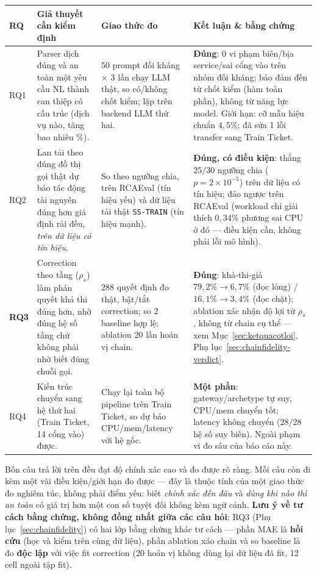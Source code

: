 \documentclass[11pt,a4paper]{article}
\begin{document}
\begin{center}\footnotesize
\begin{tabular}{p{0.9cm}p{3.5cm}p{3.6cm}p{5.4cm}}
\toprule \textbf{RQ} & \textbf{Giả thuyết cần kiểm định} & \textbf{Giao thức đo} & \textbf{Kết luận \& bằng chứng} \\ \midrule
RQ1 & Parser dịch đúng và an toàn một yêu cầu NL thành can thiệp có cấu trúc
  (dịch vụ nào, tăng bao nhiêu \%). &
  50 prompt đối kháng $\times$ 3 lần chạy LLM thật, so có/không chốt kiểm; lặp
  trên backend LLM thứ hai. &
  \textbf{Đúng}: $0$ vi phạm biên/bịa service/sai cổng vào trên nhóm đối kháng;
  bảo đảm đến từ chốt kiểm (hàm toàn phần), không từ năng lực model. Giới hạn:
  cỡ mẫu hiệu chuẩn $4{,}5\%$; đã sửa 1 lỗi transfer sang Train Ticket. \\
RQ2 & Lan tải theo đúng đồ thị gọi thật dự báo tác động tài nguyên đúng hơn giả
  định rải đều, \emph{trên dữ liệu có tín hiệu}. &
  So theo ngưỡng chia, trên RCAEval (tín hiệu yếu) và dữ liệu tải thật
  \texttt{SS-TRAIN} (tín hiệu mạnh). &
  \textbf{Đúng, có điều kiện}: thắng $25/30$ ngưỡng chia ($p{=}2{\times}10^{-5}$)
  trên dữ liệu có tín hiệu; đảo ngược trên RCAEval (workload chỉ giải thích
  $0{,}34\%$ phương sai CPU ở đó --- điều kiện cần, không phải lỗi mô hình). \\
\textbf{RQ3} & Correction theo tầng ($\rho_s$) làm phán quyết khả thi đúng hơn,
  nhờ đúng hệ số tầng chứ không phải nhờ biết đúng chuỗi gọi. &
  $288$ quyết định đo thật, bật/tắt correction; so 2 baseline hợp lệ; ablation
  20 lần hoán vị chain. &
  \textbf{Đúng}: khả-thi-giả $79,2\%\!\to\!6,7\%$ (đọc lỏng) / $16,1\%\!\to\!3,4\%$
  (đọc chặt); ablation xác nhận độ lợi từ $\rho_s$, không từ chain cụ thể --- xem
  Mục~\ref{sec:ketquacotloi}, Phụ lục~\ref{sec:chainfidelity-verdict}. \\
RQ4 & Kiến trúc chuyển sang hệ thứ hai (Train Ticket, 14 cổng vào) được. &
  Chạy lại toàn bộ pipeline trên Train Ticket, so dự báo CPU/mem/latency với hệ
  gốc. &
  \textbf{Một phần}: gateway/archetype tự suy, CPU/mem chuyển tốt; latency
  không chuyển ($28/28$ hệ số suy biến). Ngoài phạm vi đo sâu của báo cáo này. \\ \bottomrule
\end{tabular}\end{center}

Bốn câu trả lời trên đều đạt độ chính xác cao và đo được rõ ràng. Mỗi câu còn đi
kèm một vài điều kiện/giới hạn đo được --- đây là thuộc tính của một giao thức đo
nghiêm túc, không phải điểm yếu: biết \emph{chính xác đến đâu} và \emph{dùng khi
nào thì an toàn} có giá trị hơn một con số tuyệt đối không kèm ngữ cảnh.
\textbf{Lưu ý về tư cách bằng chứng, không đồng nhất giữa các câu hỏi}: RQ3 (Phụ
lục~\ref{sec:chainfidelity}) có hai lớp bằng chứng khác tư cách --- phần MAE là
\textbf{hồi cứu} (học và kiểm trên cùng dữ liệu), phần ablation xáo chain và so
baseline là đo \textbf{độc lập} với việc fit correction (20 hoán vị không dùng lại
dữ liệu đã fit, 12 cell ngoài tập fit).
\end{document}
